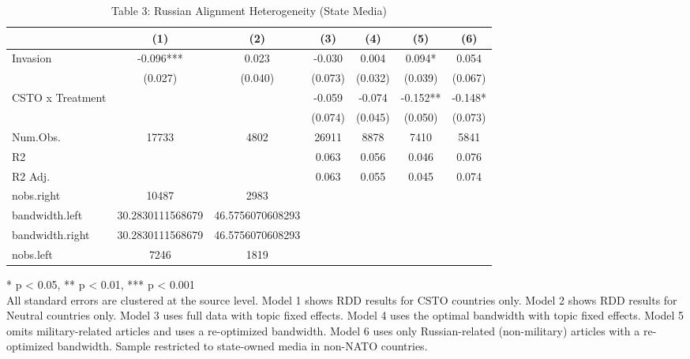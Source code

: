 \begin{table}[!t]
\caption{Table 3: Russian Alignment Heterogeneity (State Media)} 
\fontsize{12.0pt}{14.4pt}\selectfont
\begin{tabular*}{\linewidth}{@{\extracolsep{\fill}}lcccccc}
\toprule
  & (1) & (2) & (3) & (4) & (5) & (6) \\ 
\midrule\addlinespace[2.5pt]
Invasion & -0.096*** & 0.023 & -0.030 & 0.004 & 0.094* & 0.054 \\ 
 & (0.027) & (0.040) & (0.073) & (0.032) & (0.039) & (0.067) \\ 
CSTO x Treatment &  &  & -0.059 & -0.074 & -0.152** & -0.148* \\ 
{} & {} & {} & {(0.074)} & {(0.045)} & {(0.050)} & {(0.073)} \\ 
Num.Obs. & 17733 & 4802 & 26911 & 8878 & 7410 & 5841 \\ 
R2 &  &  & 0.063 & 0.056 & 0.046 & 0.076 \\ 
R2 Adj. &  &  & 0.063 & 0.055 & 0.045 & 0.074 \\ 
nobs.right & 10487 & 2983 &  &  &  &  \\ 
bandwidth.left & 30.2830111568679 & 46.5756070608293 &  &  &  &  \\ 
bandwidth.right & 30.2830111568679 & 46.5756070608293 &  &  &  &  \\ 
nobs.left & 7246 & 1819 &  &  &  &  \\ 
\bottomrule
\end{tabular*}
\begin{minipage}{\linewidth}
* p < 0.05, ** p < 0.01, *** p < 0.001\\
All standard errors are clustered at the source level. Model 1 shows RDD results
for CSTO countries only. Model 2 shows RDD results for Neutral countries only.
Model 3 uses full data with topic fixed effects. Model 4 uses the optimal
bandwidth with topic fixed effects. Model 5 omits military-related articles and
uses a re-optimized bandwidth. Model 6 uses only Russian-related (non-military)
articles with a re-optimized bandwidth. Sample restricted to state-owned media
in non-NATO countries.\\
\end{minipage}
\end{table}

